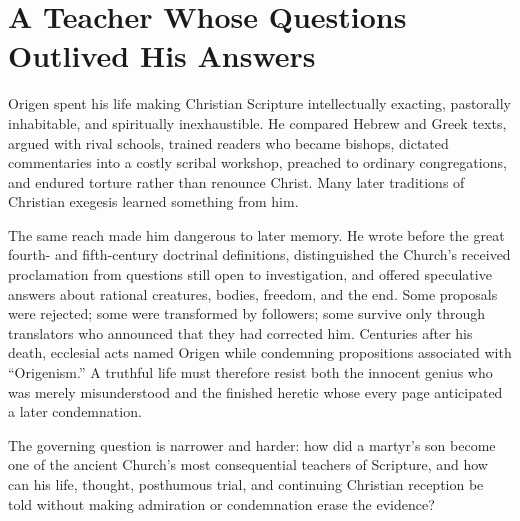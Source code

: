 \section{A Teacher Whose Questions Outlived His Answers}

Origen spent his life making Christian Scripture intellectually exacting,
pastorally inhabitable, and spiritually inexhaustible. He compared Hebrew and
Greek texts, argued with rival schools, trained readers who became bishops,
dictated commentaries into a costly scribal workshop, preached to ordinary
congregations, and endured torture rather than renounce Christ. Many later
traditions of Christian exegesis learned something from him.

The same reach made him dangerous to later memory. He wrote before the great
fourth- and fifth-century doctrinal definitions, distinguished the Church's
received proclamation from questions still open to investigation, and offered
speculative answers about rational creatures, bodies, freedom, and the end.
Some proposals were rejected; some were transformed by followers; some survive
only through translators who announced that they had corrected him. Centuries
after his death, ecclesial acts named Origen while condemning propositions
associated with ``Origenism.'' A truthful life must therefore resist both the
innocent genius who was merely misunderstood and the finished heretic whose
every page anticipated a later condemnation.

The governing question is narrower and harder: how did a martyr's son become
one of the ancient Church's most consequential teachers of Scripture, and how can his
life, thought, posthumous trial, and continuing Christian reception be told
without making admiration or condemnation erase the evidence?
